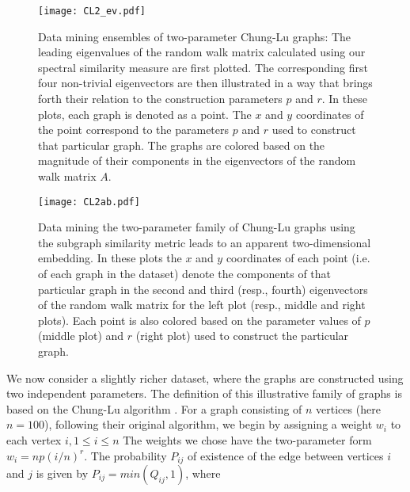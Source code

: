 \begin{figure}
  \begin{center}
    \texttt{[image: CL2\_ev.pdf]}
    \caption{\label{fig:CL2} Data mining ensembles of two-parameter
      Chung-Lu graphs: The leading eigenvalues of the random walk
      matrix calculated using our spectral similarity measure are
      first plotted.  The corresponding first four non-trivial
      eigenvectors are then illustrated in a way that brings forth
      their relation to the construction parameters $p$ and $r$.  In
      these plots, each graph is denoted as a point.  The $x$ and $y$
      coordinates of the point correspond to the parameters $p$ and
      $r$ used to construct that particular graph.  The graphs are
      colored based on the magnitude of their components in the
      eigenvectors of the random walk matrix $A$.  }
  \end{center}
\end{figure}

\begin{figure}
  \begin{center}
    \texttt{[image: CL2ab.pdf]}
    \caption{\label{fig:CL2ab} Data mining the two-parameter family of Chung-Lu graphs using the subgraph similarity metric
      leads to an apparent two-dimensional
      embedding.
      In these plots the $x$ and $y$ coordinates of each point (i.e. of each graph in the dataset)
      denote the components of that particular graph in the second and third (resp., fourth) eigenvectors of the random walk matrix
      for the left plot (resp., middle and right plots).
      Each point is also colored based on the parameter values of $p$
      (middle plot) and $r$ (right plot) used to construct the
      particular graph.  }
  \end{center}
\end{figure}

We now consider a slightly richer dataset, where the graphs are
constructed using two independent parameters.
% 
The definition of this illustrative family of graphs is based on the
Chung-Lu algorithm \cite{chung_connected_2002}.
% 
For a graph consisting of $n$ vertices (here $n=100$), following their
original algorithm, we begin by assigning a weight $w_i$ to each
vertex $i, 1 \leq i \leq n$
% 
The weights we chose have the two-parameter form $w_i = np(i/n)^r$.
% 
The probability $P_{ij}$ of existence of the edge between vertices $i$
and $j$ is given by $P_{ij}=min(Q_{ij},1)$, where

